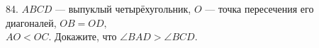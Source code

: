 84. $ABCD$ --- выпуклый четырёхугольник, $O$ --- точка пересечения его диагоналей, $OB=OD,$\\$AO<OC.$ Докажите, что $\angle BAD>\angle BCD.$\\
